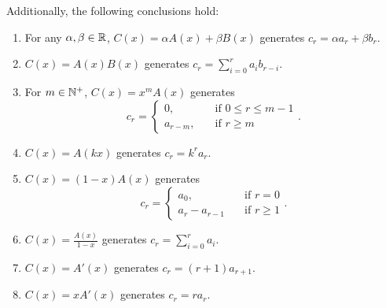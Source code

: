 \documentclass[math]{amznotes}
\theoremstyle{remark}
\begin{document}
Additionally, the following conclusions hold:
\begin{enumerate}
    \item For any $\alpha, \beta \in \mathbb{R}$, $C(x) = \alpha A(x) + \beta B(x)$ generates $c_r = \alpha a_r + \beta b_r$.
    \item $C(x) = A(x)B(x)$ generates $c_r = \sum_{i = 0}^{r}a_ib_{r - i}$.
    \item For $m \in \mathbb{N}^+$, $C(x) = x^mA(x)$ generates 
    \begin{equation*}
        c_r = \begin{cases}
            0, & \quad\textrm{if } 0 \leq r \leq m - 1 \\
            a_{r - m}, & \quad\textrm{if } r \geq m
        \end{cases}.
    \end{equation*}
    \item $C(x) = A(kx)$ generates $c_r = k^ra_r$.
    \item $C(x) = (1 - x)A(x)$ generates
    \begin{equation*}
        c_r = \begin{cases}
            a_0, & \quad\textrm{if } r = 0 \\
            a_r - a_{r - 1} & \quad\textrm{if } r \geq 1
        \end{cases}.
    \end{equation*}
    \item $C(x) = \frac{A(x)}{1 - x}$ generates $c_r = \sum_{i = 0}^{r}a_i$.
    \item $C(x) = A'(x)$ generates $c_r = (r + 1)a_{r + 1}$.
    \item $C(x) = xA'(x)$ generates $c_r = ra_r$.
\end{enumerate}
\end{document}
